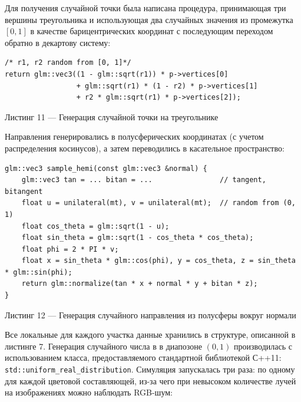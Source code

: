 \documentclass[12pt]{article}
\begin{document}
Для получения случайной точки была написана процедура, принимающая три вершины треугольника и использующая два случайных значения из промежутка $[0, 1]$ в качестве барицентрических координат с последующим переходом обратно в декартову систему:
\begin{lstlisting}
/* r1, r2 random from [0, 1]*/
return glm::vec3((1 - glm::sqrt(r1)) * p->vertices[0] 
                 + glm::sqrt(r1) * (1 - r2) * p->vertices[1] 
                 + r2 * glm::sqrt(r1) * p->vertices[2]);
\end{lstlisting}
\begin{center}Листинг 11 --- Генерация случайной точки на треугольнике \end{center}

Направления генерировались в полусферических координатах (с учетом распределения косинусов), а затем переводились в касательное пространство:
\begin{lstlisting}
glm::vec3 sample_hemi(const glm::vec3 &normal) {
    glm::vec3 tan = ... bitan = ...                // tangent, bitangent               
    float u = unilateral(mt), v = unilateral(mt);  // random from (0, 1)
    float cos_theta = glm::sqrt(1 - u);
    float sin_theta = glm::sqrt(1 - cos_theta * cos_theta);
    float phi = 2 * PI * v;
    float x = sin_theta * glm::cos(phi), y = cos_theta, z = sin_theta * glm::sin(phi);
    return glm::normalize(tan * x + normal * y + bitan * z);
}
\end{lstlisting}
\begin{center}Листинг 12 --- Генерация случайного направления из полусферы вокруг нормали \end{center}

Все локальные для каждого участка данные хранились в структуре, описанной в листинге 7. Генерация случайного числа в в диапозоне $(0, 1)$ производилась с использованием класса, предоставляемого стандартной библиотекой С++11: \texttt{std::uniform\_real\_distribution}. Симуляция запускалась три раза: по одному для каждой цветовой составляющей, из-за чего при невысоком количестве лучей на изображениях можно наблюдать RGB-шум:
\end{document}
